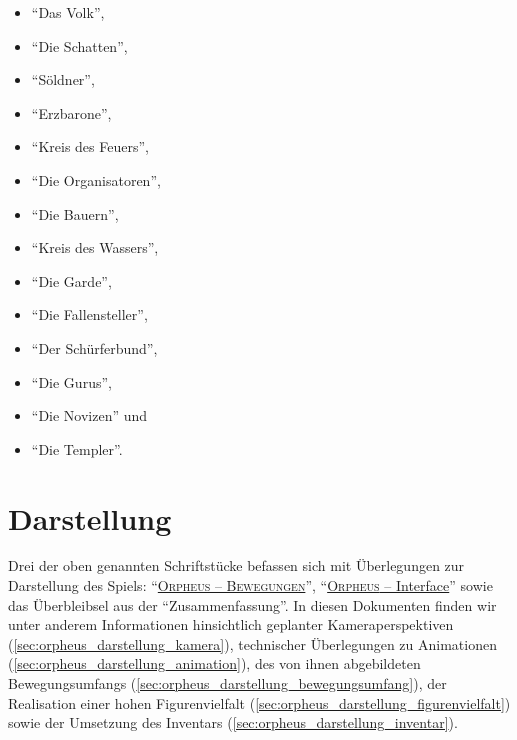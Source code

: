 \documentclass[a5paper,pagesize,numbers=noenddot]{scrbook}
\begin{document}
\begin{itemize}
   \item \enquote{Das Volk},
   \item \enquote{Die Schatten},
   \item \enquote{Söldner},
   \item \enquote{Erzbarone},
   \item \enquote{Kreis des Feuers},
   \item \enquote{Die Organisatoren},
   \item \enquote{Die Bauern},
   \item \enquote{Kreis des Wassers},
   \item \enquote{Die Garde},
   \item \enquote{Die Fallensteller},
   \item \enquote{Der Schürferbund},
   \item \enquote{Die Gurus},
   \item \enquote{Die Novizen} und
   \item \enquote{Die Templer}.
\end{itemize}


\section{Darstellung}\label{sec:orpheus_darstellung}
Drei der oben genannten Schriftstücke befassen sich mit Überlegungen zur Darstellung des Spiels:
\enquote{\uline{\textsc{Orpheus -- Bewegungen}}}, \enquote{\uline{\textsc{Orpheus} -- Interface}} sowie das Überbleibsel aus der \enquote{Zusammenfassung}.
In diesen Dokumenten finden wir unter anderem Informationen hinsichtlich geplanter Kameraperspektiven (\autoref{sec:orpheus_darstellung_kamera}), technischer Überlegungen zu Animationen (\autoref{sec:orpheus_darstellung_animation}), des von ihnen abgebildeten Bewegungsumfangs (\autoref{sec:orpheus_darstellung_bewegungsumfang}), der Realisation einer hohen Figurenvielfalt (\autoref{sec:orpheus_darstellung_figurenvielfalt}) sowie der Umsetzung des Inventars (\autoref{sec:orpheus_darstellung_inventar}).


\end{document}
